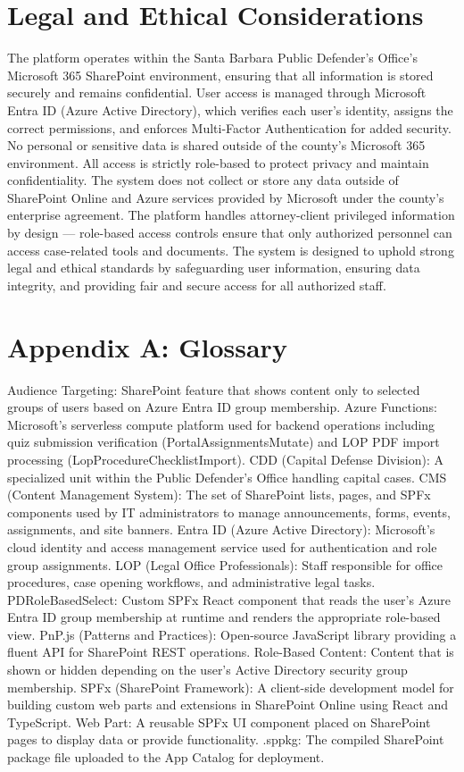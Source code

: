 \documentclass[12pt]{article}
\begin{document}
\section{Legal and Ethical Considerations}

The platform operates within the Santa Barbara Public Defender's Office's Microsoft 365 SharePoint environment, ensuring that all information is stored securely and remains confidential. User access is managed through Microsoft Entra ID (Azure Active Directory), which verifies each user's identity, assigns the correct permissions, and enforces Multi-Factor Authentication for added security. No personal or sensitive data is shared outside of the county's Microsoft 365 environment. All access is strictly role-based to protect privacy and maintain confidentiality. The system does not collect or store any data outside of SharePoint Online and Azure services provided by Microsoft under the county's enterprise agreement. The platform handles attorney-client privileged information by design --- role-based access controls ensure that only authorized personnel can access case-related tools and documents. The system is designed to uphold strong legal and ethical standards by safeguarding user information, ensuring data integrity, and providing fair and secure access for all authorized staff.

\section{Appendix A: Glossary}

Audience Targeting: SharePoint feature that shows content only to selected groups of users based on Azure Entra ID group membership. Azure Functions: Microsoft's serverless compute platform used for backend operations including quiz submission verification (PortalAssignmentsMutate) and LOP PDF import processing (LopProcedureChecklistImport). CDD (Capital Defense Division): A specialized unit within the Public Defender's Office handling capital cases. CMS (Content Management System): The set of SharePoint lists, pages, and SPFx components used by IT administrators to manage announcements, forms, events, assignments, and site banners. Entra ID (Azure Active Directory): Microsoft's cloud identity and access management service used for authentication and role group assignments. LOP (Legal Office Professionals): Staff responsible for office procedures, case opening workflows, and administrative legal tasks. PDRoleBasedSelect: Custom SPFx React component that reads the user's Azure Entra ID group membership at runtime and renders the appropriate role-based view. PnP.js (Patterns and Practices): Open-source JavaScript library providing a fluent API for SharePoint REST operations. Role-Based Content: Content that is shown or hidden depending on the user's Active Directory security group membership. SPFx (SharePoint Framework): A client-side development model for building custom web parts and extensions in SharePoint Online using React and TypeScript. Web Part: A reusable SPFx UI component placed on SharePoint pages to display data or provide functionality. .sppkg: The compiled SharePoint package file uploaded to the App Catalog for deployment.
\end{document}
